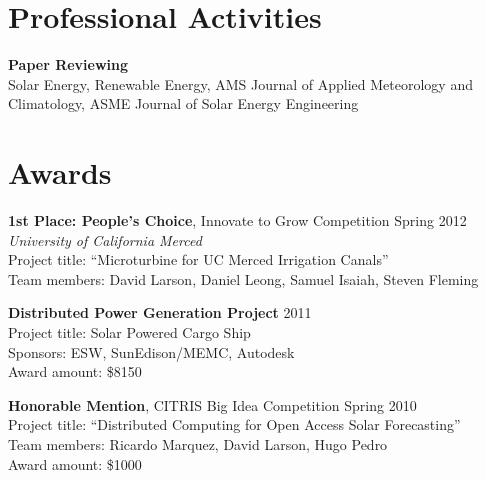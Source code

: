 \documentclass[]{res}
\begin{document}
\begin{resume}
\section{Professional Activities}
\vspace{0.1in}

\textbf{Paper Reviewing} \\
Solar Energy, Renewable Energy, AMS Journal of Applied Meteorology and
Climatology, ASME Journal of Solar Energy Engineering


%
\section{Awards}
\vspace{0.1in}

\textbf{1st Place: People's Choice}, Innovate to Grow Competition \hfill Spring 2012 \\
\textit{University of California Merced} \\
Project title: ``Microturbine for UC Merced Irrigation Canals'' \\
Team members: David Larson, Daniel Leong, Samuel Isaiah, Steven Fleming

\textbf{Distributed Power Generation Project} \hfill 2011 \\
Project title: Solar Powered Cargo Ship \\
Sponsors: ESW, SunEdison/MEMC, Autodesk \\
Award amount: \$8150

\textbf{Honorable Mention}, CITRIS Big Idea Competition \hfill Spring 2010 \\
Project title: ``Distributed Computing for Open Access Solar Forecasting'' \\
Team members: Ricardo Marquez, David Larson, Hugo Pedro \\
Award amount: \$1000




\end{resume}
\end{document}
